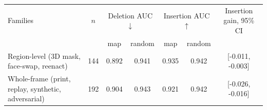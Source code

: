 \begin{tabular}{lcccccc}
\toprule
Families & $n$ & \multicolumn{2}{c}{Deletion AUC$\downarrow$} & \multicolumn{2}{c}{Insertion AUC$\uparrow$} & Insertion gain, 95\% CI \\
 & & map & random & map & random & \\
\midrule
Region-level (3D mask, face-swap, reenact) & 144 & 0.892 & 0.941 & 0.935 & 0.942 & [-0.011, -0.003] \\
Whole-frame (print, replay, synthetic, adversarial) & 192 & 0.904 & 0.943 & 0.921 & 0.942 & [-0.026, -0.016] \\
\bottomrule
\end{tabular}